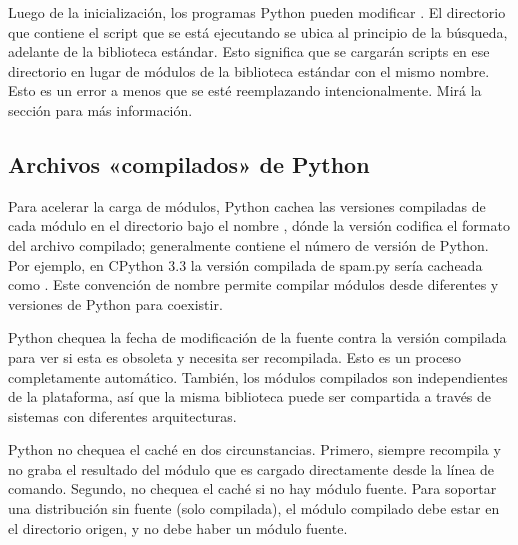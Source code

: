 \documentclass[a4,10pt,spanish]{sphinxmanual}
\begin{document}
\sphinxAtStartPar
Luego de la inicialización, los programas Python pueden modificar . El directorio que contiene el script que se está ejecutando se ubica al principio de la búsqueda, adelante de la biblioteca estándar. Esto significa que se cargarán scripts en ese directorio en lugar de módulos de la biblioteca estándar con el mismo nombre. Esto es un error a menos que se esté reemplazando intencionalmente. Mirá la sección {\hyperref[\detokenize{tutorial/modules:tut-standardmodules}]{}} para más información.


\subsection{Archivos «compilados» de Python}
\label{\detokenize{tutorial/modules:compiled-python-files}}
\sphinxAtStartPar
Para acelerar la carga de módulos, Python cachea las versiones compiladas de cada módulo en el directorio  bajo el nombre , dónde la versión codifica el formato del archivo compilado; generalmente contiene el número de versión de Python. Por ejemplo, en CPython  3.3 la versión compilada de spam.py sería cacheada como . Este convención de nombre permite compilar módulos desde diferentes  y versiones de Python para coexistir.

\sphinxAtStartPar
Python chequea la fecha de modificación de la fuente contra la versión compilada para ver si esta es obsoleta y necesita ser recompilada. Esto es un proceso completamente automático. También, los módulos compilados son independientes de la plataforma, así que la misma biblioteca puede ser compartida a través de sistemas con diferentes arquitecturas.

\sphinxAtStartPar
Python no chequea el caché en dos circunstancias. Primero, siempre recompila y no graba el resultado del módulo que es cargado directamente desde la línea de comando. Segundo, no chequea el caché si no hay módulo fuente. Para soportar una distribución sin fuente (solo compilada), el módulo compilado debe estar en el directorio origen, y no debe haber un módulo fuente.
\end{document}
